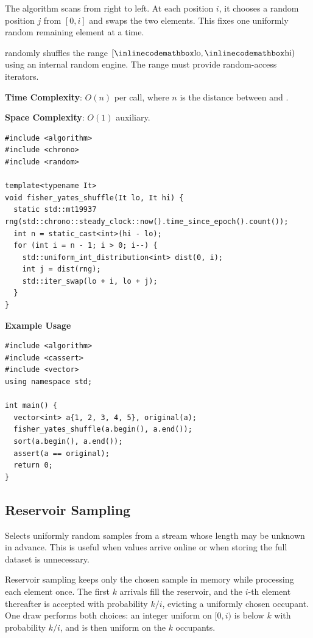 The algorithm scans from right to left. At each position $i$, it chooses a random position $j$ from $[0, i]$ and swaps the two elements. This fixes one uniformly random remaining element at a time.

\begin{compactitem}
  \item {} randomly shuffles the range $[{\inlinecodemath{lo}}, {\inlinecodemath{hi}})$ using an internal random engine. The range must provide random-access iterators.
\end{compactitem}

\textbf{Time Complexity}: $O(n)$ per call, where $n$ is the distance between  and .

\textbf{Space Complexity}: $O(1)$ auxiliary.

\begin{lstlisting}[style=cpp]
#include <algorithm>
#include <chrono>
#include <random>

template<typename It>
void fisher_yates_shuffle(It lo, It hi) {
  static std::mt19937 rng(std::chrono::steady_clock::now().time_since_epoch().count());
  int n = static_cast<int>(hi - lo);
  for (int i = n - 1; i > 0; i--) {
    std::uniform_int_distribution<int> dist(0, i);
    int j = dist(rng);
    std::iter_swap(lo + i, lo + j);
  }
}
\end{lstlisting}
\textbf{Example Usage}\par
\begin{lstlisting}[style=cpp]
#include <algorithm>
#include <cassert>
#include <vector>
using namespace std;

int main() {
  vector<int> a{1, 2, 3, 4, 5}, original(a);
  fisher_yates_shuffle(a.begin(), a.end());
  sort(a.begin(), a.end());
  assert(a == original);
  return 0;
}
\end{lstlisting}
\subsection{Reservoir Sampling}
\label{sec:1.6.2}
Selects uniformly random samples from a stream whose length may be unknown in advance. This is useful when values arrive online or when storing the full dataset is unnecessary.

Reservoir sampling keeps only the chosen sample in memory while processing each element once. The first $k$ arrivals fill the reservoir, and the $i$-th element thereafter is accepted with probability $k/i$, evicting a uniformly chosen occupant. One draw performs both choices: an integer uniform on $[0, i)$ is below $k$ with probability $k/i$, and is then uniform on the $k$ occupants.

